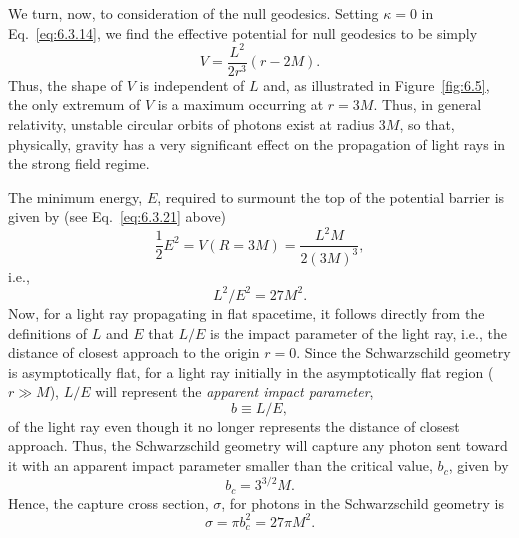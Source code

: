We turn, now, to consideration of the null geodesics. Setting \(\kappa=0\) in
Eq.~\eqref{eq:6.3.14}, we find the effective potential for null geodesics to be
simply
\begin{equation}
  V=\frac{L^2}{2r^3}(r-2M).
  \tag{6.3.29}\label{eq:6.3.29}
\end{equation}
Thus, the shape of \(V\) is independent of \(L\) and, as illustrated in
Figure~\ref{fig:6.5}, the only extremum of \(V\) is a maximum occurring at
\(r=3M\). Thus, in general relativity, unstable circular orbits of photons exist
at radius \(3M\), so that, physically, gravity has a very significant effect on
the propagation of light rays in the strong field regime.

The minimum energy, \(E\), required to surmount the top of the potential barrier
is given by (see Eq.~\eqref{eq:6.3.21} above)
\begin{equation}
  \frac12E^2=V(R=3M)=\frac{L^2M}{2(3M)^3},
  \tag{6.3.30}\label{eq:6.3.30}
\end{equation}
i.e.,
\begin{equation}
  L^2/E^2=27M^2.
  \tag{6.3.31}\label{eq:6.3.31}
\end{equation}
Now, for a light ray propagating in flat spacetime, it follows directly from the
definitions of \(L\) and \(E\) that \(L/E\) is the impact parameter of the light
ray, i.e., the distance of closest approach to the origin \(r=0\). Since the
Schwarzschild geometry is asymptotically flat, for a light ray initially in the
asymptotically flat region (\(r\gg M\)), \(L/E\) will represent the \emph{apparent
impact parameter},
\begin{equation}
  b\equiv L/E,
  \tag{6.3.32}\label{eq:6.3.32}
\end{equation}
of the light ray even though it no longer represents the distance of closest
approach. Thus, the Schwarzschild geometry will capture any photon sent toward it
with an apparent impact parameter smaller than the critical value, \(b_c\), given
by
\begin{equation}
  b_c=3^{3/2}M.
  \tag{6.3.33}\label{eq:6.3.33}
\end{equation}
Hence, the capture cross section, \(\sigma\), for photons in the Schwarzschild
geometry is
\begin{equation}
  \sigma=\pi b_c^2=27\pi M^2.
  \tag{6.3.34}\label{eq:6.3.34}
\end{equation}

